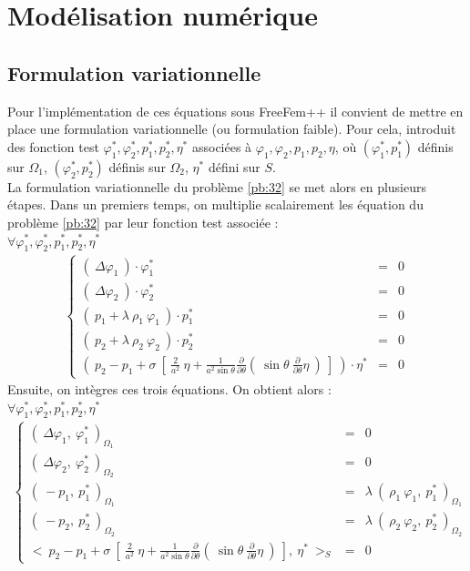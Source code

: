 \documentclass[a4paper]{report}
\begin{document}
\section{Modélisation numérique}
\subsection{Formulation variationnelle}
Pour l'implémentation de ces équations sous FreeFem++ il convient de mettre en place une formulation variationnelle (ou formulation faible). Pour cela, introduit des fonction test $\varphi^*_1, \varphi^*_2, p^*_1, p^*_2, \eta^*$ associées à $\varphi_1, \varphi_2, p_1, p_2, \eta$, où $(\varphi^*_1, p^*_1)$ définis sur $\Omega_1$, $(\varphi^*_2, p^*_2)$ définis sur $\Omega_2$, $\eta^*$ défini sur $S$.
\\[0.25cm]
La formulation variationnelle du problème \eqref{pb:32} se met alors en plusieurs étapes. Dans un premiers temps, on multiplie scalairement les équation du problème \eqref{pb:32} par leur fonction test associée :
\\[0.25cm]
$\forall \varphi^*_1, \varphi^*_2, p^*_1, p^*_2, \eta^*$
\begin{eqnarray*}
\left\{
\begin{array}{rcl}
\left(\ \Delta \varphi_1\ \right) \cdot \varphi^*_1 &=& 0 \\
\left(\ \Delta \varphi_2\ \right) \cdot \varphi^*_2 &=& 0 \\
\left(\ p_1 + \lambda\ \rho_1\ \varphi_1\ \right) \cdot p^*_1 &=& 0 \\
\left(\ p_2 + \lambda\ \rho_2\ \varphi_2\ \right) \cdot p^*_2 &=& 0 \\
\left(\ p_2 - p_1 + \sigma\ \left[\ \frac{2}{a^2} \ \eta
                    + \frac{1}{a^2 \sin\theta} \frac{\partial}{\partial \theta}(\ \sin\theta \ \frac{\partial}{\partial \theta} \eta \ )\ \right]\ \right) \cdot \eta^* &=& 0
\end{array}
\right.
\end{eqnarray*}
Ensuite, on intègres ces trois équations. On obtient alors :
\\[0.25cm]
$\forall \varphi^*_1, \varphi^*_2, p^*_1, p^*_2, \eta^*$
\begin{eqnarray*}
\left\{
\begin{array}{rcl}
(\ \Delta \varphi_1 ,\ \varphi^*_1 \ )_{\Omega_1} &=& 0 \\
(\ \Delta \varphi_2 ,\ \varphi^*_2 \ )_{\Omega_2} &=& 0 \\
(\ - p_1 ,\ p^*_1 \ )_{\Omega_1} &=& \lambda\ (\ \rho_1\ \varphi_1 ,\ p^*_1 \ )_{\Omega_1} \\
(\ - p_2 ,\ p^*_2 \ )_{\Omega_2} &=& \lambda\ (\ \rho_2\ \varphi_2 ,\ p^*_2 \ )_{\Omega_2} \\
<\ p_2 - p_1 + \sigma\ \left[\ \frac{2}{a^2} \ \eta
                       + \frac{1}{a^2 \sin\theta} \frac{\partial}{\partial \theta}(\ \sin\theta \ \frac{\partial}{\partial \theta} \eta \ )\ \right] ,\ \eta^* \ >_S &=& 0
\end{array}
\right.
\end{eqnarray*}
\end{document}
